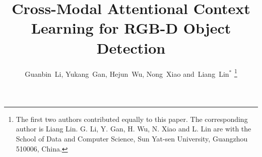 \documentclass[journal]{IEEEtran}
\begin{document}
%
\title{Cross-Modal Attentional Context Learning for RGB-D Object Detection}
%
%

\author{
        Guanbin~Li,
        Yukang~Gan,
        Hejun~Wu,       
        Nong~Xiao                
        and~Liang~Lin$^*$
\thanks{The first two authors contributed equally to this paper. The corresponding author is Liang Lin. G. Li, Y. Gan, H. Wu, N. Xiao and L. Lin are with the School of Data and Computer Science, Sun Yat-sen University, Guangzhou 510006, China.}
}



\end{document}

